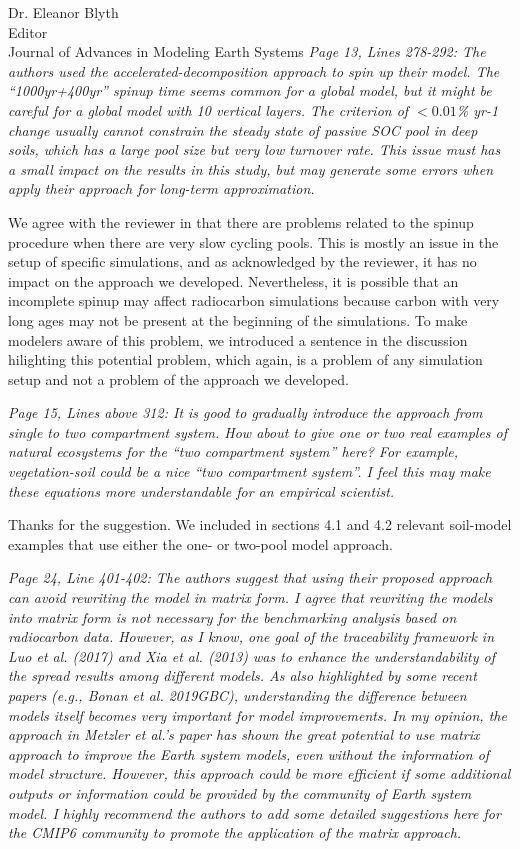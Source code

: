 \documentclass[11pt]{bgcletter}
\begin{document}
\begin{letter}{Dr. Eleanor Blyth\\
 Editor \\ Journal of Advances in Modeling Earth Systems}
{\it Page 13, Lines 278-292: The authors used the accelerated-decomposition approach to spin up their model. The ``1000yr+400yr'' spinup time seems common for a global model, but it might be careful for a global model with 10 vertical layers. The criterion of $<0.01$\% yr-1 change usually cannot constrain the steady state of passive SOC pool in deep soils, which has a large pool size but very low turnover rate. This issue must has a small impact on the results in this study, but may generate some errors when apply their approach for long-term approximation. }

{\color{blue} We agree with the reviewer in that there are problems related to the spinup procedure when there are very slow cycling pools. This is mostly an issue in the setup of specific simulations, and as acknowledged by the reviewer, it has no impact on the approach we developed. Nevertheless, it is possible that an incomplete spinup may affect radiocarbon simulations because carbon with very long ages may not be present at the beginning of the simulations. To make modelers aware of this problem, we introduced a sentence in the discussion hilighting this potential problem, which again, is a problem of any simulation setup and not a problem of the approach we developed.}

{\it Page 15, Lines above 312: It is good to gradually introduce the approach from single to two compartment system. How about to give one or two real examples of natural ecosystems for the ``two compartment system'' here? For example, vegetation-soil could be a nice ``two compartment system''. I feel this may make these equations more understandable for an empirical scientist.}

{\color{blue} Thanks for the suggestion. We included in sections 4.1 and 4.2 relevant soil-model examples that use either the one- or two-pool model approach.}

{\it Page 24, Line 401-402: The authors suggest that using their proposed approach can avoid rewriting the model in matrix form. I agree that rewriting the models into matrix form is not necessary for the benchmarking analysis based on radiocarbon data. However, as I know, one goal of the traceability framework in Luo et al. (2017) and Xia et al. (2013) was to enhance the understandability of the spread results among different models. As also highlighted by some recent papers (e.g., Bonan et al. 2019GBC), understanding the difference between models itself becomes very important for model improvements. In my opinion, the approach in Metzler et al.'s paper has shown the great potential to use matrix approach to improve the Earth system models, even without the information of model structure. However, this approach could be more efficient if some additional outputs or information could be provided by the community of Earth system model. I highly recommend the authors to add some detailed suggestions here for the CMIP6 community to promote the application of the matrix approach. }


\end{letter}
\end{document}
